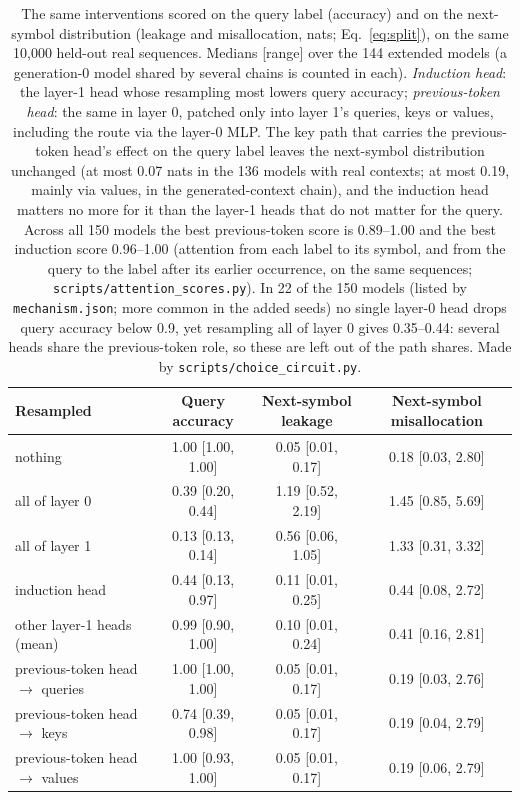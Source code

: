 \documentclass[10pt,letterpaper]{article}
\begin{document}
\begin{table}[H]
\centering
\caption{ The same interventions scored on the query label (accuracy) and on the next-symbol distribution (leakage and misallocation, nats; Eq.~\ref{eq:split}), on the same 10{,}000 held-out real sequences. Medians [range] over the 144 extended models (a generation-0 model shared by several chains is counted in each). \emph{Induction head}: the layer-1 head whose resampling most lowers query accuracy; \emph{previous-token head}: the same in layer 0, patched only into layer 1's queries, keys or values, including the route via the layer-0 MLP. The key path that carries the previous-token head's effect on the query label leaves the next-symbol distribution unchanged (at most 0.07 nats in the 136 models with real contexts; at most 0.19, mainly via values, in the generated-context chain), and the induction head matters no more for it than the layer-1 heads that do not matter for the query. Across all 150 models the best previous-token score is 0.89--1.00 and the best induction score 0.96--1.00 (attention from each label to its symbol, and from the query to the label after its earlier occurrence, on the same sequences; \texttt{scripts/attention\_scores.py}). In 22 of the 150 models (listed by \texttt{mechanism.json}; more common in the added seeds) no single layer-0 head drops query accuracy below 0.9, yet resampling all of layer 0 gives 0.35--0.44: several heads share the previous-token role, so these are left out of the path shares. Made by \texttt{scripts/choice\_circuit.py}.}
\small
\begin{tabular}{@{}lccc@{}}
\toprule
Resampled & Query accuracy & Next-symbol leakage & Next-symbol misallocation \\
\midrule
nothing & 1.00 [1.00, 1.00] & 0.05 [0.01, 0.17] & 0.18 [0.03, 2.80] \\
all of layer 0 & 0.39 [0.20, 0.44] & 1.19 [0.52, 2.19] & 1.45 [0.85, 5.69] \\
all of layer 1 & 0.13 [0.13, 0.14] & 0.56 [0.06, 1.05] & 1.33 [0.31, 3.32] \\
induction head & 0.44 [0.13, 0.97] & 0.11 [0.01, 0.25] & 0.44 [0.08, 2.72] \\
other layer-1 heads (mean) & 0.99 [0.90, 1.00] & 0.10 [0.01, 0.24] & 0.41 [0.16, 2.81] \\
previous-token head $\to$ queries & 1.00 [1.00, 1.00] & 0.05 [0.01, 0.17] & 0.19 [0.03, 2.76] \\
previous-token head $\to$ keys & 0.74 [0.39, 0.98] & 0.05 [0.01, 0.17] & 0.19 [0.04, 2.79] \\
previous-token head $\to$ values & 1.00 [0.93, 1.00] & 0.05 [0.01, 0.17] & 0.19 [0.06, 2.79] \\
\bottomrule
\end{tabular}
\label{tab:choice}
\end{table}
\end{document}
